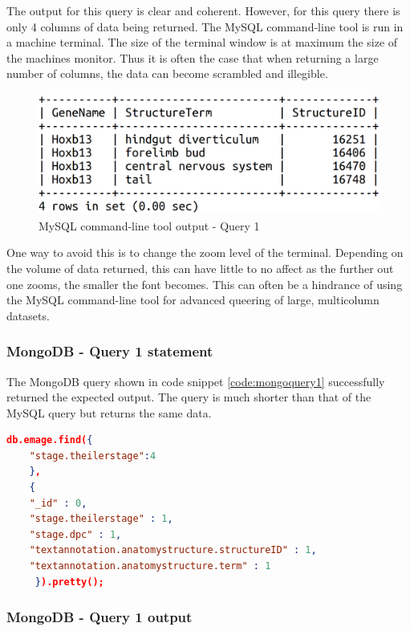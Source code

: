 The output for this query is clear and coherent. However, for this query there is only 4 columns of data being returned. The MySQL command-line tool is run in a machine terminal. The size of the terminal window is at maximum the size of the machines monitor. Thus it is often the case that when returning a large number of columns, the data can become scrambled and illegible.
\begin{figure}[H]\begin{center}\includegraphics[height=4cm,width=0.9\linewidth]{images/mysqlquery1}\caption{MySQL command-line tool output - Query 1}\label{fig:mysqlquery1}\end{center}\end{figure}
One way to avoid this is to change the zoom level of the terminal. Depending on the volume of data returned, this can have little to no affect as the further out one zooms, the smaller the font becomes. This can often be a hindrance of using the MySQL command-line tool for advanced queering of large, multicolumn datasets.

\subsubsection*{MongoDB - Query 1 statement}\label{mongoquery1statement}
The MongoDB query shown in code snippet \ref{code:mongoquery1} successfully returned the expected output. The query is much shorter than that of the MySQL query but returns the same data.

\begin{lstlisting}[language=json, caption=MongoDB Query 1 statement. All structures at Theiler Stage 4, label=code:mongoquery1]
db.emage.find({
    "stage.theilerstage":4
    },
    {
    "_id" : 0,
    "stage.theilerstage" : 1,
    "stage.dpc" : 1,
    "textannotation.anatomystructure.structureID" : 1,
    "textannotation.anatomystructure.term" : 1
     }).pretty();
\end{lstlisting}

\subsubsection*{MongoDB - Query 1 output}\label{mongoquery1output}


